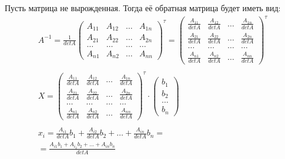 \begin{answer}
Пусть матрица не вырожденная. Тогда её обратная матрица будет иметь вид: 
\begin{gather*}
  A^{-1} = \frac{1}{det A} \left( 
    \begin{matrix}
    A_{11} & A_{12} & \ldots & A_{1n} \\
    A_{21} & A_{22} & \ldots & A_{2n} \\
    \ldots & \ldots & \ldots & \ldots \\
    A_{n1} & A_{n2} & \ldots & A_{nn}
    \end{matrix}
  \right)^{\tau} = \left( 
  \begin{matrix}
    \frac{A_{11}}{det A} & \frac{A_{12}}{det A} & \ldots & \frac{A_{1n}}{det A} \\
    \frac{A_{21}}{det A} & \frac{A_{22}}{det A} & \ldots & \frac{A_{2n}}{det A} \\
    \ldots & \ldots & \ldots & \ldots \\
    \frac{A_{n1}}{det A} & \frac{A_{n2}}{det A} & \ldots & \frac{A_{nn}}{det A}
  \end{matrix}
  \right)^{\tau} \\
  \\
  X = \left( 
  \begin{matrix}
    \frac{A_{11}}{det A} & \frac{A_{12}}{det A} & \ldots & \frac{A_{1n}}{det A} \\
    \frac{A_{21}}{det A} & \frac{A_{22}}{det A} & \ldots & \frac{A_{2n}}{det A} \\
    \ldots & \ldots & \ldots & \ldots \\
    \frac{A_{n1}}{det A} & \frac{A_{n2}}{det A} & \ldots & \frac{A_{nn}}{det A}
  \end{matrix}\right)^{\tau} \cdot \left( 
  \begin{matrix}
    b_1 \\
    b_2 \\
    \ldots \\
    b_{n}
  \end{matrix}
\right) \\
  \\
  x_i = 
  \frac{A_{i1}}{det A} b_1 +
  \frac{A_{i2}}{det A} b_2 +
  \ldots +
  \frac{A_{in}}{det A} b_n = \\
  = \frac{A_{i1}b_1 + A_{i_2}b_2 + \ldots + A_{in}b_n}{det A}
\end{gather*}


\end{answer}
